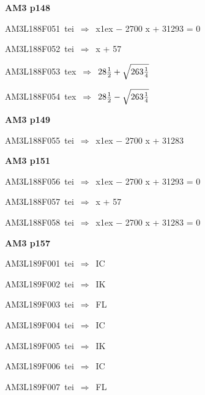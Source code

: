 \par\vfill\eject
{\bf\hfill AM3 p148\hfill\hbox{}}\par\bigskip
{\sixrm AM3L188F051\ {\sixit tei}\ }$\Rightarrow$\ {\tenit x}\raise1ex\hbox{} − 2700 {\tenit x} + 31293 = 0\par\smallskip
{\sixrm AM3L188F052\ {\sixit tei}\ }$\Rightarrow$\ {\tenit x} + 57\par\smallskip
{\sixrm AM3L188F053\ {\sixit tex}\ }$\Rightarrow$\ $28{{1\over 2}} + \sqrt{263{{1\over 4}}}$\par\smallskip
{\sixrm AM3L188F054\ {\sixit tex}\ }$\Rightarrow$\ $28{{1\over 2}}- \sqrt{263{{1\over 4}}}$\par\smallskip

\par\vfill\eject
{\bf\hfill AM3 p149\hfill\hbox{}}\par\bigskip
{\sixrm AM3L188F055\ {\sixit tei}\ }$\Rightarrow$\ {\tenit x}\raise1ex\hbox{} − 2700 {\tenit x} + 31283\par\smallskip

\par\vfill\eject
{\bf\hfill AM3 p151\hfill\hbox{}}\par\bigskip
{\sixrm AM3L188F056\ {\sixit tei}\ }$\Rightarrow$\ {\tenit x}\raise1ex\hbox{} − 2700 {\tenit x} + 31293 = 0\par\smallskip
{\sixrm AM3L188F057\ {\sixit tei}\ }$\Rightarrow$\ {\tenit x} + 57\par\smallskip
{\sixrm AM3L188F058\ {\sixit tei}\ }$\Rightarrow$\ {\tenit x}\raise1ex\hbox{} − 2700 {\tenit x} + 31283 = 0\par\smallskip

\par\vfill\eject
{\bf\hfill AM3 p157\hfill\hbox{}}\par\bigskip
{\sixrm AM3L189F001\ {\sixit tei}\ }$\Rightarrow$\ IC\par\smallskip
{\sixrm AM3L189F002\ {\sixit tei}\ }$\Rightarrow$\ IK\par\smallskip
{\sixrm AM3L189F003\ {\sixit tei}\ }$\Rightarrow$\ FL\par\smallskip
{\sixrm AM3L189F004\ {\sixit tei}\ }$\Rightarrow$\ IC\par\smallskip
{\sixrm AM3L189F005\ {\sixit tei}\ }$\Rightarrow$\ IK\par\smallskip
{\sixrm AM3L189F006\ {\sixit tei}\ }$\Rightarrow$\ IC\par\smallskip
{\sixrm AM3L189F007\ {\sixit tei}\ }$\Rightarrow$\ FL\par\smallskip


